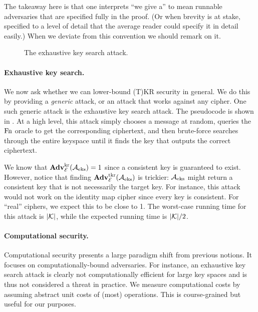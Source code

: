 The takeaway here is that one interprets ``we give a'' to mean runnable
adversaries that are specified fully in the proof. (Or when brevity is at stake,
specified to a level of detail that the average reader could specify it in
detail easily.)  When we deviate from this convention we should remark on it.

\begin{wrapfigure}{r}{0pt}
	\caption{The exhaustive key search attack.}
	\label{fig:eks}
\end{wrapfigure} 


\paragraph{Exhaustive key search.} We now ask whether we can lower-bound (T)KR security in general. We do this by providing a \textit{generic} attack, or an attack that works against any cipher. One such generic attack is the exhaustive key search attack. The pseudocode is shown in . At a high level, this attack simply chooses a message at random, queries the $\textnormal{Fn}$ oracle to get the corresponding ciphertext, and then brute-force searches through the entire keyspace until it finds the key that outputs the correct ciphertext.  

We know that $\mathbf{Adv}^{\mathrm{kr}}_{{\cal E}}({\mathcal A}_{\textnormal{eks}}) = 1$ since a consistent key is guaranteed to exist. However, notice that finding $\mathbf{Adv}^{\mathrm{tkr}}_{{\cal E}}({\mathcal A}_{\textnormal{eks}})$ is trickier: ${\mathcal A}_{\textnormal{eks}}$ might return a consistent key that is not necessarily the target key. For instance, this attack would not work on the identity map cipher since every key is consistent. For ``real'' ciphers, we expect this to be close to 1. 
The worst-case running time for this attack is $|{\cal K}|$, while the expected running time is $|{\cal K}|/2$.

\paragraph{Computational security.} Computational security presents a large paradigm shift from previous notions. It focuses on computationally-bound adversaries. For instance, an exhaustive key search attack is clearly not computationally efficient for large key spaces and is thus not considered a threat in practice. We measure computational costs by assuming abstract unit costs of (most) operations. This is course-grained but useful for our purposes. 

